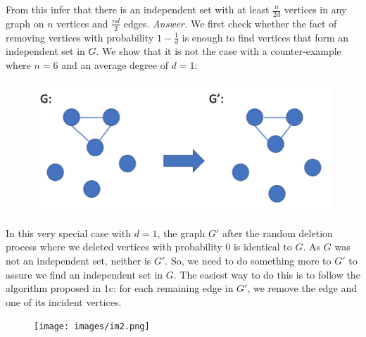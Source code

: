 \documentclass[10pt]{article}
\newenvironment{exercise}[2][Exercise]{\begin{trivlist}
  \item[\hskip \labelsep {\bfseries #1}\hskip \labelsep {\bfseries #2.}]}{\end{trivlist}}
\begin{document}
  \begin{exercise}{1b}
  From this infer that there is an independent set with at least $\frac{n}{2d}$ vertices in any graph on $n$ vertices and $\frac{nd}{2}$ edges. \newline
  \emph{Answer.} We first check whether the fact of removing vertices with probability $1-\frac{1}{d}$ is enough to find vertices that form an independent set in $G$. We show that it is not the case with a counter-example where $n = 6$ and an average degree of $d = 1$: 

  \begin{figure}[h]
  \includegraphics[scale=0.4]{images/im1.png}
  \centering
  \end{figure}
  
 In this very special case with $d=1$, the graph $G'$ after the random deletion process where we deleted vertices with probability $0$ is identical to $G$. As $G$ was not an independent set, neither is $G'$. \newline
 So, we need to do something more to $G'$ to assure we find an independent set in $G$. The easiest way to do this is to follow the algorithm proposed in 1c: for each remaining edge in $G'$, we remove the edge and one of its incident vertices.  
 
 \begin{figure}[h]
  \texttt{[image: images/im2.png]}
  \centering
  \end{figure}
  

\end{exercise}
\end{document}
